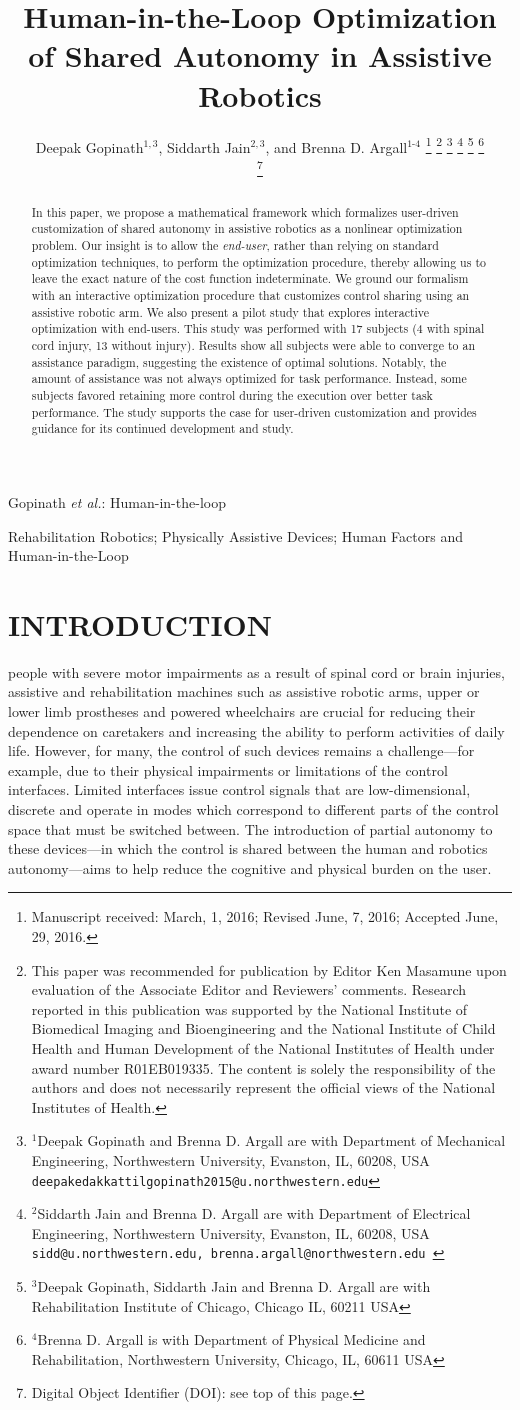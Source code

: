 \documentclass[letterpaper, 10 pt, journal, twoside]{IEEEtran}  %
\title{
	Human-in-the-Loop Optimization of Shared Autonomy in Assistive Robotics
}
\author{Deepak Gopinath$^{1,3}$, Siddarth Jain$^{2,3}$, and Brenna D. Argall$^{1\text{-}4}$%
	\thanks{Manuscript received: March, 1, 2016; Revised June,
		7, 2016; Accepted June, 29, 2016.}%
	\thanks{This paper was recommended for publication by Editor
		Ken Masamune upon evaluation of the Associate Editor and
		Reviewers' comments. Research reported in this publication was supported by the
		National Institute of Biomedical Imaging and Bioengineering  and the National Institute of Child Health and Human Development of the National Institutes of Health
		under award number R01EB019335.  The content is solely
		the responsibility of the authors and does not necessarily
		represent the official views of the National Institutes of Health.}%
	\thanks{$^{1}$Deepak Gopinath and Brenna D. Argall are with Department of Mechanical Engineering, Northwestern University, Evanston, IL, 60208, USA
		{\tt\small deepakedakkattilgopinath2015@u.northwestern.edu}}%
	\thanks{$^{2} $Siddarth Jain and Brenna D. Argall are with Department of Electrical Engineering, Northwestern University, Evanston, IL, 60208, USA {\tt\small sidd@u.northwestern.edu, brenna.argall@northwestern.edu }}%
	\thanks{$^{3} $Deepak Gopinath, Siddarth Jain and Brenna D. Argall are with Rehabilitation Institute of Chicago, Chicago IL, 60211 USA}%
	\thanks{$^{4} $Brenna D. Argall is with Department of Physical Medicine and Rehabilitation, Northwestern University, Chicago, IL, 60611 USA}%

	\thanks{Digital Object Identifier (DOI): see top of this page.}
}
\begin{document}
	\maketitle
	{Gopinath \MakeLowercase{\textit{et al.}}:
		Human-in-the-loop}
	
	
		\begin{abstract}
			In this paper, we propose a mathematical framework which formalizes user-driven customization of shared autonomy in assistive robotics as a nonlinear optimization problem. 
			Our insight is to allow the \textit{end-user}, rather than relying on standard optimization techniques, to perform the optimization procedure, thereby allowing us to leave the exact nature of the cost function indeterminate.
			We ground our formalism with an interactive
			optimization procedure that customizes
			control sharing using an assistive robotic arm. We also present
			a pilot study that explores interactive optimization with
			end-users.
			This study was performed with 17 subjects (4 with spinal cord injury, 13 without injury). Results
			show all subjects were able to converge to an assistance paradigm, suggesting the existence of optimal solutions. Notably, the amount of assistance was not always
			optimized for task performance. Instead, some subjects
			favored retaining more control during the execution over better task
			performance.
			The study supports the case for user-driven customization and provides
			guidance for its continued development and study.
		\end{abstract}
	\begin{IEEEkeywords}
	Rehabilitation Robotics; Physically Assistive Devices; Human Factors and Human-in-the-Loop
	\end{IEEEkeywords}
		
	\section{INTRODUCTION} \label{Intro}
	
	 people with severe motor impairments as a result of spinal cord or
	brain injuries, assistive and rehabilitation machines such as
	assistive robotic arms, upper or lower limb prostheses and powered
	wheelchairs are crucial for reducing their dependence on caretakers
	and increasing the ability to perform activities of daily life. 
	However, for many, the control of such devices remains a
	challenge---for example, due to their physical impairments or limitations of the control interfaces. Limited interfaces issue control signals that are low-dimensional, discrete and operate in modes which correspond to different parts of the control space that must be switched between. The introduction of
	partial autonomy to these devices---in which the control is shared
	between the human and robotics autonomy---aims to help reduce the cognitive and physical burden on the user. 
	
\end{document}
